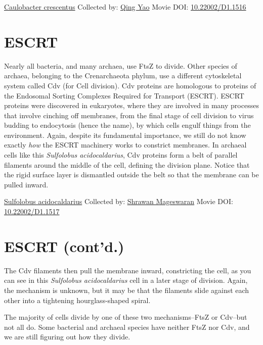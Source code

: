 \documentclass[]{tufte-book}
\begin{document}
\hypertarget{htmlwidget-1d5a095a33ca0a91ecb9}{}

\label{fig:5-10}\protect\hyperlink{tree}{Caulobacter crescentus} Collected by: \protect\hyperlink{qing_yao}{Qing Yao} Movie DOI: \href{https://doi.org/10.22002/D1.1516}{10.22002/D1.1516}

\hypertarget{escrt}{%
\section{ESCRT}\label{escrt}}

Nearly all bacteria, and many archaea, use FtsZ to divide. Other species of archaea, belonging to the Crenarchaeota phylum, use a different cytoskeletal system called Cdv (for Cell division). Cdv proteins are homologous to proteins of the Endosomal Sorting Complexes Required for Transport (ESCRT). ESCRT proteins were discovered in eukaryotes, where they are involved in many processes that involve cinching off membranes, from the final stage of cell division to virus budding to endocytosis (hence the name), by which cells engulf things from the environment. Again, despite its fundamental importance, we still do not know exactly \emph{how} the ESCRT machinery works to constrict membranes. In archaeal cells like this \emph{Sulfolobus acidocaldarius}, Cdv proteins form a belt of parallel filaments around the middle of the cell, defining the division plane. Notice that the rigid surface layer is dismantled outside the belt so that the membrane can be pulled inward.



\hypertarget{htmlwidget-fe60160d92a6bf6af1f8}{}

\label{fig:5-11}\protect\hyperlink{tree}{Sulfolobus acidocaldarius} Collected by: \protect\hyperlink{shrawan_mageswaran}{Shrawan Mageswaran} Movie DOI: \href{https://doi.org/10.22002/D1.1517}{10.22002/D1.1517}

\hypertarget{escrt-contd.}{%
\section{ESCRT (cont'd.)}\label{escrt-contd.}}

The Cdv filaments then pull the membrane inward, constricting the cell, as you can see in this \emph{Sulfolobus acidocaldarius} cell in a later stage of division. Again, the mechanism is unknown, but it may be that the filaments slide against each other into a tightening hourglass-shaped spiral.

The majority of cells divide by one of these two mechanisms--FtsZ or Cdv--but not all do. Some bacterial and archaeal species have neither FtsZ nor Cdv, and we are still figuring out how they divide.
\end{document}
